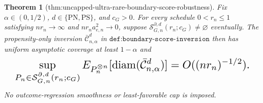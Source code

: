 \documentclass{article}
\newtheorem{theorem}{Theorem}
\begin{document}
\begin{theorem}[thm:uncapped-ultra-rare-boundary-score-robustness]\label{thm:uncapped-ultra-rare-boundary-score-robustness}
Fix \(\alpha\in(0,1/2)\), \(d\in\{\mathrm{PN},\mathrm{PS}\}\), and \(c_G>0\). For every schedule \(0<r_n\le1\) satisfying \(nr_n\to\infty\) and \(nr_na_{e,n}^2\to0\), suppose \(\mathcal S_{G,n}^{\partial,d}(r_n;c_G)\ne\varnothing\) eventually. The propensity-only inversion \(\bar{\mathcal C}_{n,\alpha}^d\) in \(\texttt{def:boundary-score-inversion}\) then has uniform asymptotic coverage at least \(1-\alpha\) and
\[
\makebox[\linewidth][c]{\resizebox{0.98\linewidth}{!}{\par\noindent \makebox[\linewidth][c]{\resizebox{0.98\linewidth}{!}{\(\displaystyle \displaystyle \sup_{P_n\in\mathcal S_{G,n}^{\partial,d}(r_n;c_G)}E_{P_n^{\otimes n}}[\operatorname{diam}(\bar{\mathcal C}_{n,\alpha}^d)]=O((nr_n)^{-1/2}).\)}}\par\noindent}}
\]
No outcome-regression smoothness or least-favorable cap is imposed.
\end{theorem}
\end{document}

